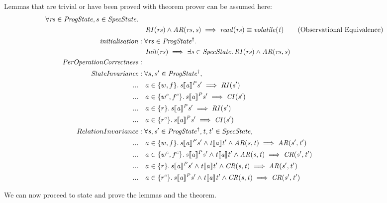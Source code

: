 \documentclass[a4paper,11pt]{article}
\theoremstyle{definition}
\begin{document}
Lemmas that are trivial or have been proved with theorem prover can be assumed here:
\begin{align*}
	\forall \mathit{rs} \in \mathit{ProgState},s \in \mathit{SpecState} \ldotp \\
	 & \quad \mathit{RI(rs)} \land \mathit{AR(rs, s)} \implies \mathit{read(rs)} \equiv \mathit{volatile(t)} \tag{Observational Equivalence}\\
	\mathit{initialisation} &: \forall \mathit{rs} \in \mathit{ProgState^\dagger} \ldotp\\
	 &\quad \mathit{Init(rs) \implies \exists s \in SpecState \ldotp RI(rs) \land AR(rs, s)}\\
	\mathit{PerOperationCorrectness} &:\\
	 \mathit{StateInvariance} &: \forall s, s' \in \mathit{ProgState^\dagger},\\
	...	 &\quad a \in \{w, f\} \ldotp \mathit{s \llbracket a \rrbracket^P s' \implies RI(s')}\\
	...	 &\quad a \in \{w^c, f^c\} \ldotp \mathit{s \llbracket a \rrbracket^P s' \implies CI(s')}\\
	...	 &\quad a \in \{r\} \ldotp \mathit{s \llbracket a \rrbracket^P s' \implies RI(s')}\\
	...	 &\quad a \in \{r^c\} \ldotp \mathit{s \llbracket a \rrbracket^P s' \implies CI(s')}\\
	RelationInvariance &: \mathit{\forall s, s' \in ProgState^\dagger, t, t' \in SpecState,}\\
	...	& \quad a \in \{w, f\} \ldotp \mathit{s \llbracket a \rrbracket^P s' \land t \llbracket a \rrbracket t' \land AR(s, t) \implies AR(s', t')}\\
	...	& \quad a \in \{w^c, f^c\} \ldotp \mathit{s \llbracket a \rrbracket^P s' \land t \llbracket a \rrbracket t' \land AR(s, t) \implies CR(s', t')}\\
	...	& \quad a \in \{r\} \ldotp \mathit{s \llbracket a \rrbracket^P s' \land t \llbracket a \rrbracket t' \land CR(s, t) \implies AR(s', t')}\\
	...	& \quad a \in \{r^c\} \ldotp \mathit{s \llbracket a \rrbracket^P s' \land t \llbracket a \rrbracket t' \land CR(s, t) \implies CR(s', t')}\\
\end{align*}

We can now proceed to state and prove the lemmas and the theorem.
\end{document}
